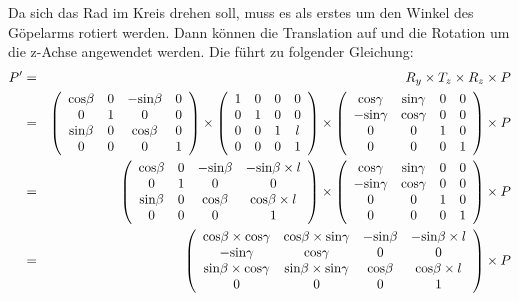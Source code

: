 \documentclass[a4paper,12pt]{article}
\begin{document}
Da sich das Rad im Kreis drehen soll, muss es als erstes um den Winkel des
Göpelarms rotiert werden. Dann können die Translation auf und die Rotation um
die z-Achse angewendet werden. Die führt zu folgender Gleichung:
\begin{eqnarray}
P' & = & R_{y} \times T_{z} \times R_{z} \times P \nonumber \\
& = & \left(\begin{array}{ c c c c }
\mbox{cos} \beta & 0 & - \mbox{sin} \beta & 0 \\
0 & 1 & 0 & 0 \\
\mbox{sin} \beta & 0 & \mbox{cos} \beta & 0 \\
0 & 0 & 0 & 1
\end{array} \right) \times \left(\begin{array}{ c c c c }
1 & 0 & 0 & 0 \\
0 & 1 & 0 & 0 \\
0 & 0 & 1 & l \\
0 & 0 & 0 & 1
\end{array} \right) \times \left(\begin{array}{ c c c c }
\mbox{cos} \gamma & \mbox{sin} \gamma & 0 & 0 \\
- \mbox{sin} \gamma & \mbox{cos} \gamma & 0 & 0 \\
0 & 0 & 1 & 0 \\
0 & 0 & 0 & 1
\end{array} \right) \times P \nonumber \\
& = & \left(\begin{array}{ c c c c }
\mbox{cos} \beta & 0 & - \mbox{sin} \beta & - \mbox{sin} \beta \times l \\
0 & 1 & 0 & 0 \\
\mbox{sin} \beta & 0 & \mbox{cos} \beta & \mbox{cos} \beta \times l \\
0 & 0 & 0 & 1
\end{array} \right) \times \left(\begin{array}{ c c c c }
\mbox{cos} \gamma & \mbox{sin} \gamma & 0 & 0 \\
- \mbox{sin} \gamma & \mbox{cos} \gamma & 0 & 0 \\
0 & 0 & 1 & 0 \\
0 & 0 & 0 & 1
\end{array} \right) \times P \nonumber \\
& = & \left(\begin{array}{ c c c c }
\mbox{cos} \beta \times \mbox{cos} \gamma &
\mbox{cos} \beta \times \mbox{sin} \gamma &
- \mbox{sin} \beta & - \mbox{sin} \beta \times l \\
- \mbox{sin} \gamma & \mbox{cos} \gamma & 0 & 0 \\
\mbox{sin} \beta \times \mbox{cos} \gamma &
\mbox{sin} \beta \times \mbox{sin} \gamma &
\mbox{cos} \beta & \mbox{cos} \beta \times l \\
0 & 0 & 0 & 1
\end{array} \right) \times P
\end{eqnarray}
\end{document}

